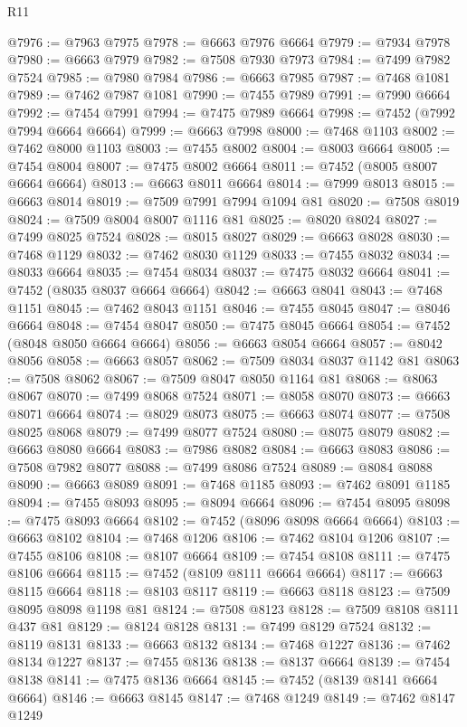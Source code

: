 \begin{lexlean}{R11}
\begin{coremodule}
{{{{{{{{{{{{{{{{{{{{{{{{{{{{{{{{{{{{{{{{{{{{{{{{{{{{{{{{{{{{{{{{{{{{{{{{{{{{{{{{{{@7976 := @7963 @7975
@7978 := @6663 @7976 @6664
@7979 := @7934 @7978
@7980 := @6663 @7979
@7982 := @7508 @7930 @7973
@7984 := @7499 @7982 @7524
@7985 := @7980 @7984
@7986 := @6663 @7985
@7987 := @7468 @1081
@7989 := @7462 @7987 @1081
@7990 := @7455 @7989
@7991 := @7990 @6664
@7992 := @7454 @7991
@7994 := @7475 @7989 @6664
@7998 := @7452 (@7992 @7994 @6664 @6664)
@7999 := @6663 @7998
@8000 := @7468 @1103
@8002 := @7462 @8000 @1103
@8003 := @7455 @8002
@8004 := @8003 @6664
@8005 := @7454 @8004
@8007 := @7475 @8002 @6664
@8011 := @7452 (@8005 @8007 @6664 @6664)
@8013 := @6663 @8011 @6664
@8014 := @7999 @8013
@8015 := @6663 @8014
@8019 := @7509 @7991 @7994 @1094 @81
@8020 := @7508 @8019
@8024 := @7509 @8004 @8007 @1116 @81
@8025 := @8020 @8024
@8027 := @7499 @8025 @7524
@8028 := @8015 @8027
@8029 := @6663 @8028
@8030 := @7468 @1129
@8032 := @7462 @8030 @1129
@8033 := @7455 @8032
@8034 := @8033 @6664
@8035 := @7454 @8034
@8037 := @7475 @8032 @6664
@8041 := @7452 (@8035 @8037 @6664 @6664)
@8042 := @6663 @8041
@8043 := @7468 @1151
@8045 := @7462 @8043 @1151
@8046 := @7455 @8045
@8047 := @8046 @6664
@8048 := @7454 @8047
@8050 := @7475 @8045 @6664
@8054 := @7452 (@8048 @8050 @6664 @6664)
@8056 := @6663 @8054 @6664
@8057 := @8042 @8056
@8058 := @6663 @8057
@8062 := @7509 @8034 @8037 @1142 @81
@8063 := @7508 @8062
@8067 := @7509 @8047 @8050 @1164 @81
@8068 := @8063 @8067
@8070 := @7499 @8068 @7524
@8071 := @8058 @8070
@8073 := @6663 @8071 @6664
@8074 := @8029 @8073
@8075 := @6663 @8074
@8077 := @7508 @8025 @8068
@8079 := @7499 @8077 @7524
@8080 := @8075 @8079
@8082 := @6663 @8080 @6664
@8083 := @7986 @8082
@8084 := @6663 @8083
@8086 := @7508 @7982 @8077
@8088 := @7499 @8086 @7524
@8089 := @8084 @8088
@8090 := @6663 @8089
@8091 := @7468 @1185
@8093 := @7462 @8091 @1185
@8094 := @7455 @8093
@8095 := @8094 @6664
@8096 := @7454 @8095
@8098 := @7475 @8093 @6664
@8102 := @7452 (@8096 @8098 @6664 @6664)
@8103 := @6663 @8102
@8104 := @7468 @1206
@8106 := @7462 @8104 @1206
@8107 := @7455 @8106
@8108 := @8107 @6664
@8109 := @7454 @8108
@8111 := @7475 @8106 @6664
@8115 := @7452 (@8109 @8111 @6664 @6664)
@8117 := @6663 @8115 @6664
@8118 := @8103 @8117
@8119 := @6663 @8118
@8123 := @7509 @8095 @8098 @1198 @81
@8124 := @7508 @8123
@8128 := @7509 @8108 @8111 @437 @81
@8129 := @8124 @8128
@8131 := @7499 @8129 @7524
@8132 := @8119 @8131
@8133 := @6663 @8132
@8134 := @7468 @1227
@8136 := @7462 @8134 @1227
@8137 := @7455 @8136
@8138 := @8137 @6664
@8139 := @7454 @8138
@8141 := @7475 @8136 @6664
@8145 := @7452 (@8139 @8141 @6664 @6664)
@8146 := @6663 @8145
@8147 := @7468 @1249
@8149 := @7462 @8147 @1249
}}}}}}}}}}}}}}}}}}}}}}}}}}}}}}}}}}}}}}}}}}}}}}}}}}}}}}}}}}}}}}}}}}}}}}}}}}}}}}}}}}
\end{coremodule}
\end{lexlean}
